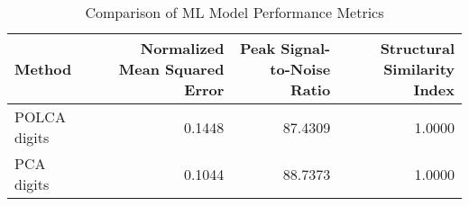\begin{table}[htbp]
\caption{Comparison of ML Model Performance Metrics}
\label{tab:model_comparison}
\begin{tabular}{lrrr}
\toprule
Method & Normalized Mean Squared Error & Peak Signal-to-Noise Ratio & Structural Similarity Index \\
\midrule
POLCA digits & 0.1448 & 87.4309 & 1.0000 \\
PCA digits & 0.1044 & 88.7373 & 1.0000 \\
\bottomrule
\end{tabular}
\end{table}
